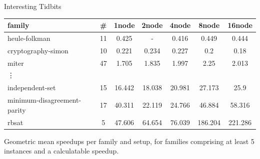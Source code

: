 \documentclass[]{sdqbeamer}
\begin{document}
\begin{frame}{Interesting Tidbits}
    \centering
    \begin{table}[!h]
        \center
        \begin{tabular}{ lcccccc }
            \toprule
            family	&	\#	&	1node	&	2node	&	4node	&	8node	&	16node\\
            \midrule
            heule-folkman	&	11	&	0.425	&	-	&	0.416	&	0.449	&	0.444\\
            cryptography-simon	&	10	&	0.221	&	0.234	&	0.227	&	0.2	&	0.18\\
            miter	&	47	&	1.705	&	1.835	&	1.997	&	2.25	&	2.013\\
            \vdots &&&&&&\\
            independent-set	&	15	&	16.442	&	18.038	&	20.981	&	27.173	&	25.9\\
            minimum-disagreement-parity	&	17	&	40.311	&	22.119	&	24.766	&	46.884	&	58.316\\
            rbsat	&	5	&	47.606	&	64.654	&	76.039	&	186.204	&	221.286\\
            \bottomrule
        \end{tabular}
    \end{table}
    \vfill
    Geometric mean speedups per family and setup, for families comprising at least 5 instances and a calculatable speedup.
\end{frame}
\end{document}
